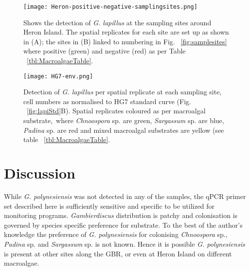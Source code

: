 \documentclass[12pt]{article}
\begin{document}
\FloatBarrier 
\begin{figure} 
\texttt{[image: Heron-positive-negative-samplingsites.png]} 
\caption{Shows the detection of \emph{G. lapillus} at the sampling sites around Heron Island. The spatial replicates for each site are set up as shown in (A); the sites in (B) linked to numbering in Fig. ~\ref{fig:samplesites} where positive (green) and negative (red) as per Table ~\ref{tbl:MacroalgaeTable}.} 
\label{fig:envposneg}
\end{figure} 
\FloatBarrier

\FloatBarrier 
\begin{figure} 
\texttt{[image: HG7-env.png]} 
\caption{Detection of \emph{G. lapillus} per spatial replicate at each sampling site, cell numbers as normalised to HG7 standard curve (Fig. ~\ref{fig:lapiStd}B). Spatial replicates coloured as per macroalgal substrate,\ where \emph{Chnoospora} sp. are green, \emph{Sargassum} sp. are blue, \emph{Padina} sp. are red and mixed macroalgal substrates are yellow (see table ~\ref{tbl:MacroalgaeTable}.} 
\label{fig:envHG7}
\end{figure} 
\FloatBarrier

\newpage
\section{Discussion}







While \emph{G. polynesiensis} was not detected in any of the samples, the qPCR primer set described here is sufficiently sensitive and specific to be utilized for monitoring programs. \emph{Gambierdiscus} distribution is patchy and colonisation is governed by species specific preference for substrate. To the best of the author's knowledge the preference of \emph{G. polynesiensis} for colonising \emph{Chnoospora} sp., \emph{Padina} sp. and \emph{Sargassum} sp. is not known. Hence it is possible \emph{G. polynesiensis} is present at other sites along the GBR, or even at Heron Island on different macroalgae.
\end{document}
